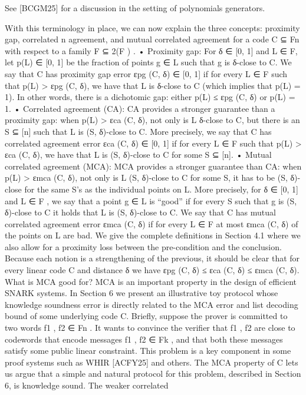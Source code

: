 \documentclass[11pt]{article}
\begin{document}
See [BCGM25] for a discussion in the setting of polynomials generators.

With this terminology in place, we can now explain the three concepts: proximity gap, correlated
n
agreement, and mutual correlated agreement for a code C ⊆ Fn with respect to a family F ⊆ 2(F ) .
• Proximity gap: For δ ∈ [0, 1] and L ∈ F, let p(L) ∈ [0, 1] be the fraction of points g ∈ L
such that g is δ-close to C. We say that C has proximity gap error εpg (C, δ) ∈ [0, 1] if for every
L ∈ F such that p(L) > εpg (C, δ), we have that L is δ-close to C (which implies that p(L) = 1).
In other words, there is a dichotomic gap: either p(L) ≤ εpg (C, δ) or p(L) = 1.
• Correlated agreement (CA): CA provides a stronger guarantee than a proximity gap: when
p(L) > εca (C, δ), not only is L δ-close to C, but there is an S ⊆ [n] such that L is (S, δ)-close
to C. More precisely, we say that C has correlated agreement error εca (C, δ) ∈ [0, 1] if for every
L ∈ F such that p(L) > εca (C, δ), we have that L is (S, δ)-close to C for some S ⊆ [n].
• Mutual correlated agreement (MCA): MCA provides a stronger guarantee than CA: when
p(L) > εmca (C, δ), not only is L (S, δ)-close to C for some S, it has to be (S, δ)-close for the same
S’s as the individual points on L. More precisely, for δ ∈ [0, 1] and L ∈ F , we say that a point
g ∈ L is “good” if for every S such that g is (S, δ)-close to C it holds that L is (S, δ)-close to C.
We say that C has mutual correlated agreement error εmca (C, δ) if for every L ∈ F at most
εmca (C, δ) of the points on L are bad.
We give the complete definitions in Section 4.1 where we also allow for a proximity loss between
the pre-condition and the conclusion. Because each notion is a strengthening of the previous, it
should be clear that for every linear code C and distance δ we have
εpg (C, δ) ≤ εca (C, δ) ≤ εmca (C, δ).
What is MCA good for? MCA is an important property in the design of efficient SNARK
systems. In Section 6 we present an illustrative toy protocol whose knowledge soundness error is
directly related to the MCA error and list decoding bound of some underlying code C. Briefly,
suppose the prover is committed to two words f1 , f2 ∈ Fn . It wants to convince the verifier that
f1 , f2 are close to codewords that encode messages f1 , f2 ∈ Fk , and that both these messages
satisfy some public linear constraint. This problem is a key component in some proof systems such
as WHIR [ACFY25] and others. The MCA property of C lets us argue that a simple and natural
protocol for this problem, described in Section 6, is knowledge sound. The weaker correlated
\end{document}
